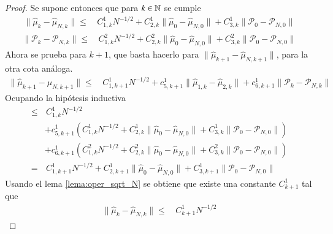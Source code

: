 \begin{proof}
	Se supone entonces que para $k \in \mathbb{N}$ se cumple 
	\begin{equation*}
		\begin{aligned}
			\| \hat \mu_{k} - \hat \mu_{N,k}  \| \leq & \, C_{1,k}^1 N^{-1/2} + C_{2,k}^1 \| \hat \mu_{0} - \hat \mu_{N, 0} \| + C_{3,k}^1 \| \mathcal{P}_{0}  - \mathcal{P}_{N, 0}  \|
		\end{aligned}
	\end{equation*}
	\begin{equation*}
		\begin{aligned}
			\| \mathcal{P}_{k} - \mathcal{P}_{N,k}  \| \leq & \, C_{1,k}^2 N^{-1/2} + C_{2,k}^2 \| \hat \mu_{0} - \hat \mu_{N, 0} \| + C_{3,k}^2 \| \mathcal{P}_{0} - \mathcal{P}_{N, 0} \|
		\end{aligned}
	\end{equation*}
	Ahora se prueba para $k+1$, que basta hacerlo para $\| \hat \mu_{k+1} - \hat \mu_{N,k+1}  \|$, para la otra cota análoga.
	\begin{equation*}
	\begin{aligned}
		\| \hat \mu_{k+1} - \hat \mu_{N,k+1}  \| \leq & \, C_{1,k+1}^1 N^{-1/2} + c_{5,k+1}^1 \| \hat \mu_{1, k} - \hat \mu_{2, k} \| + c_{6,k+1}^1 \| \mathcal{P}_{k}  - \mathcal{P}_{N, k}  \| 
	\end{aligned}
	\end{equation*}
	Ocupando la hipótesis inductiva
	\begin{equation*}
	\begin{aligned}
		\leq & \, C_{1,k}^1 N^{-1/2} \\
		& + c_{5,k+1}^1 (C_{1,k}^1 N^{-1/2} + C_{2,k}^1 \| \hat \mu_{0} - \hat \mu_{N, 0} \| + C_{3,k}^1 \| \mathcal{P}_{0}  - \mathcal{P}_{N, 0}  \|) \\
		& + c_{6,k+1}^1 (C_{1,k}^2 N^{-1/2} + C_{2,k}^2 \| \hat \mu_{0} - \hat \mu_{N, 0} \| + C_{3,k}^2 \| \mathcal{P}_{0} - \mathcal{P}_{N, 0} \|) \\
		= & \, C_{1,k+1}^1 N^{-1/2} + C_{2,k+1}^1 \| \hat \mu_{0} - \hat \mu_{N, 0} \| + C_{3,k+1}^1 \| \mathcal{P}_{0} - \mathcal{P}_{N, 0} \|
	\end{aligned}
	\end{equation*}
	Usando el lema \ref{lema:oper_sqrt_N} se obtiene que existe una constante $C_{k+1}^1$ tal que
	\begin{equation*}
		\begin{aligned}
			\| \hat \mu_{k} - \hat \mu_{N,k}  \| \leq & \, C_{k+1}^1 N^{-1/2}
		\end{aligned}
	\end{equation*}
\end{proof}

